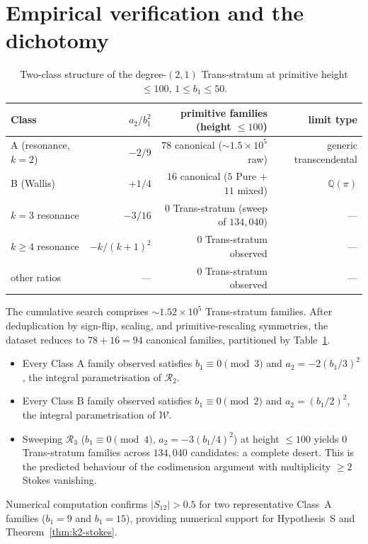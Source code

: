\documentclass[11pt,a4paper]{article}
\theoremstyle{definition}
\begin{document}
\section{Empirical verification and the dichotomy}\label{sec:empirical}

\begin{table}[h]
\centering
\begin{tabular}{lrrr}
\toprule
Class & $a_2/b_1^2$ & primitive families (height $\le 100$) & limit type \\
\midrule
A (resonance, $k=2$) & $-2/9$ & $78$ canonical ($\sim\!1.5\times 10^5$ raw) & generic transcendental \\
B (Wallis) & $+1/4$ & $16$ canonical ($5$ Pure $+$ $11$ mixed) & $\mathbb{Q}(\pi)$ \\
\midrule
$k=3$ resonance & $-3/16$ & $0$ Trans-stratum (sweep of $134{,}040$) & --- \\
$k\ge 4$ resonance & $-k/(k+1)^2$ & $0$ Trans-stratum observed & --- \\
other ratios & --- & $0$ Trans-stratum observed & --- \\
\bottomrule
\end{tabular}
\caption{Two-class structure of the degree-$(2,1)$ Trans-stratum at primitive height $\le 100$, $1\le b_1 \le 50$.}
\label{tab:dichotomy}
\end{table}

The cumulative search comprises $\sim\!1.52\times 10^5$ Trans-stratum families. After deduplication by sign-flip, scaling, and primitive-rescaling symmetries, the dataset reduces to $78 + 16 = 94$ canonical families, partitioned by Table~\ref{tab:dichotomy}.

\begin{itemize}
  \item Every Class A family observed satisfies $b_1 \equiv 0 \pmod 3$ and $a_2 = -2(b_1/3)^2$, the integral parametrisation of $\mathcal{R}_2$.
  \item Every Class B family observed satisfies $b_1\equiv 0\pmod 2$ and $a_2 = (b_1/2)^2$, the integral parametrisation of $\mathcal{W}$.
  \item Sweeping $\mathcal{R}_3$ ($b_1\equiv 0\pmod 4$, $a_2 = -3(b_1/4)^2$) at height $\le 100$ yields $0$ Trans-stratum families across $134{,}040$ candidates: a complete desert. This is the predicted behaviour of the codimension argument with multiplicity $\ge 2$ Stokes vanishing.
\end{itemize}

Numerical computation confirms $|S_{12}| > 0.5$ for two representative Class~A families ($b_1 = 9$ and $b_1 = 15$), providing numerical support for Hypothesis~S and Theorem~\ref{thm:k2-stokes}.
\end{document}
